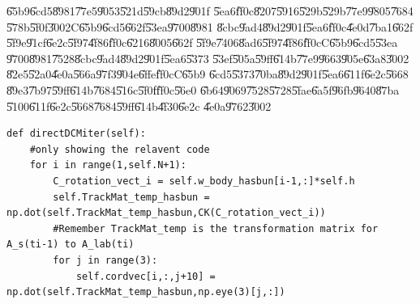 \U{65b9}\U{6cd5}\U{8981}\U{77e5}\U{9053}\U{521d}\U{59cb}\U{89d2}\U{901f}%
\U{5ea6}\U{ff0c}\U{8207}\U{5916}\U{529b}\U{529b}\U{77e9}\U{9805}\U{7684}%
\U{578b}\U{5f0f}\U{3002}C\U{65b9}\U{6cd5}\U{662f}\U{53ea}\U{9700}\U{8981}%
\U{8cbc}\U{9ad4}\U{89d2}\U{901f}\U{5ea6}\U{ff0c}\U{4e0d}\U{7ba1}\U{662f}%
\U{5f9e}\U{91cf}\U{6e2c}\U{5f97}\U{4f86}\U{ff0c}\U{6216}\U{8005}\U{662f}%
\U{5f9e}\U{7406}\U{8ad6}\U{5f97}\U{4f86}\U{ff0c}C\U{65b9}\U{6cd5}\U{53ea}%
\U{9700}\U{8981}\U{7528}\U{8cbc}\U{9ad4}\U{89d2}\U{901f}\U{5ea6}\U{5373}%
\U{53ef}\U{505a}\U{59ff}\U{614b}\U{77e9}\U{9663}\U{905e}\U{63a8}\U{3002}%
\U{82e5}\U{52a0}\U{4e0a}\U{566a}\U{97f3}\U{904e}\U{6ffe}\U{ff0c}C\U{65b9}%
\U{6cd5}\U{5373}\U{70ba}\U{89d2}\U{901f}\U{5ea6}\U{611f}\U{6e2c}\U{5668}%
\U{89e3}\U{7b97}\U{59ff}\U{614b}\U{7684}\U{516c}\U{5f0f}\U{ff0c}\U{56e0}%
\U{6b64}\U{9069}\U{7528}\U{5728}\U{5fae}\U{6a5f}\U{96fb}\U{9640}\U{87ba}%
\U{5100}\U{611f}\U{6e2c}\U{5668}\U{7684}\U{59ff}\U{614b}\U{4f30}\U{6e2c}%
\U{4e0a}\U{9762}\U{3002}

\begin{mdframed}[leftline=false, rightline=false,backgroundcolor=bg]
\begin{verbatim}
def directDCMiter(self):
    #only showing the relavent code
    for i in range(1,self.N+1):
        C_rotation_vect_i = self.w_body_hasbun[i-1,:]*self.h
        self.TrackMat_temp_hasbun = np.dot(self.TrackMat_temp_hasbun,CK(C_rotation_vect_i))
        #Remember TrackMat_temp is the transformation matrix for A_s(ti-1) to A_lab(ti)
        for j in range(3):
            self.cordvec[i,:,j+10] = np.dot(self.TrackMat_temp_hasbun,np.eye(3)[j,:])
\end{verbatim}
\end{mdframed}

